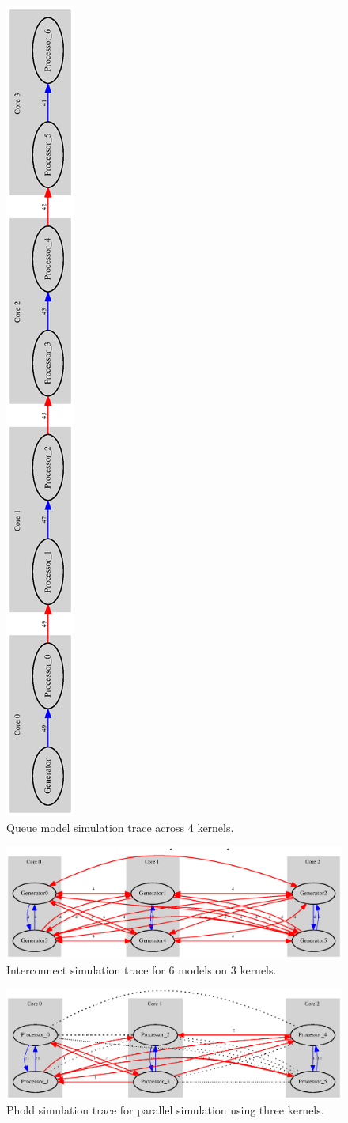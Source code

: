 \begin{figure}
    \center
    \includegraphics[height=\textwidth, angle=-90 ]{fig/queue_allocation.eps}
    \caption{Queue model simulation trace across 4 kernels.}
    \label{fig:Queue_allocation}
\end{figure}
\begin{figure}
    \center
    \includegraphics[width=\plotfraction\columnwidth]{fig/interconnect_parallel_allocation.eps}
    \caption{Interconnect simulation trace for 6 models on 3 kernels.}
    \label{fig:interconnect_allocation_parallel}
\end{figure}
\begin{figure}
    \center
    \includegraphics[width=\plotfraction\columnwidth]{fig/phold_parallel_allocation.eps}
    \caption{Phold simulation trace for parallel simulation using three kernels.}
    \label{fig:phold_allocation}
\end{figure}
